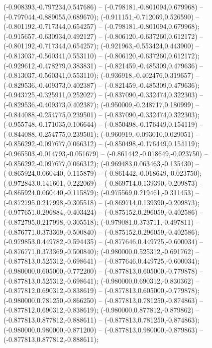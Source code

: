  (-0.908393,-0.797234,0.547686) -- (-0.798181,-0.801094,0.679968) -- (-0.797044,-0.889055,0.689670);
 (-0.911151,-0.712069,0.526590) -- (-0.801192,-0.717344,0.654257) -- (-0.798181,-0.801094,0.679968);
 (-0.915657,-0.630934,0.492127) -- (-0.806120,-0.637260,0.612172) -- (-0.801192,-0.717344,0.654257);
 (-0.921963,-0.553424,0.443900) -- (-0.813037,-0.560341,0.553110) -- (-0.806120,-0.637260,0.612172);
 (-0.929612,-0.478279,0.383831) -- (-0.821459,-0.485309,0.479636) -- (-0.813037,-0.560341,0.553110);
 (-0.936918,-0.402476,0.319657) -- (-0.829536,-0.409373,0.402387) -- (-0.821459,-0.485309,0.479636);
 (-0.943725,-0.325911,0.252027) -- (-0.837090,-0.332474,0.322303) -- (-0.829536,-0.409373,0.402387);
 (-0.950009,-0.248717,0.180999) -- (-0.844088,-0.254775,0.239501) -- (-0.837090,-0.332474,0.322303);
 (-0.955748,-0.171035,0.106644) -- (-0.850498,-0.176449,0.154119) -- (-0.844088,-0.254775,0.239501);
 (-0.960919,-0.093010,0.029051) -- (-0.856292,-0.097677,0.066312) -- (-0.850498,-0.176449,0.154119);
 (-0.965503,-0.014793,-0.051679) -- (-0.861442,-0.018649,-0.023750) -- (-0.856292,-0.097677,0.066312);
 (-0.969483,0.063463,-0.135430) -- (-0.865924,0.060440,-0.115879) -- (-0.861442,-0.018649,-0.023750);
 (-0.972843,0.141601,-0.222069) -- (-0.869714,0.139390,-0.209873) -- (-0.865924,0.060440,-0.115879);
 (-0.975569,0.219461,-0.311453) -- (-0.872795,0.217998,-0.305518) -- (-0.869714,0.139390,-0.209873);
 (-0.977651,0.296884,-0.403424) -- (-0.875152,0.296059,-0.402586) -- (-0.872795,0.217998,-0.305518);
 (-0.979081,0.373711,-0.497811) -- (-0.876771,0.373369,-0.500840) -- (-0.875152,0.296059,-0.402586);
 (-0.979853,0.449782,-0.594435) -- (-0.877646,0.449725,-0.600034) -- (-0.876771,0.373369,-0.500840);
 (-0.980000,0.525312,-0.691762) -- (-0.877813,0.525312,-0.698641) -- (-0.877646,0.449725,-0.600034);
 (-0.980000,0.605000,-0.772200) -- (-0.877813,0.605000,-0.779878) -- (-0.877813,0.525312,-0.698641);
 (-0.980000,0.690312,-0.830362) -- (-0.877812,0.690312,-0.838619) -- (-0.877813,0.605000,-0.779878);
 (-0.980000,0.781250,-0.866250) -- (-0.877813,0.781250,-0.874863) -- (-0.877812,0.690312,-0.838619);
 (-0.980000,0.877812,-0.879862) -- (-0.877813,0.877812,-0.888611) -- (-0.877813,0.781250,-0.874863);
 (-0.980000,0.980000,-0.871200) -- (-0.877813,0.980000,-0.879863) -- (-0.877813,0.877812,-0.888611);
